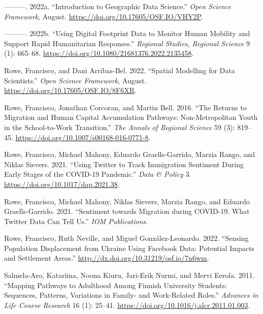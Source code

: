 \documentclass[
  letterpaper,
  DIV=11,
  numbers=noendperiod]{scrreprt}
\newlength{\cslhangindent}
\newlength{\cslentryspacingunit} %
\newenvironment{CSLReferences}[2] %
 {%
  \setlength{\parindent}{0pt}
  \ifodd #1
  \let\oldpar\par
  \def\par{\hangindent=\cslhangindent\oldpar}
  \fi
  \setlength{\parskip}{#2\cslentryspacingunit}
 }%
 {}
\begin{document}
\begin{CSLReferences}{1}{0}
\leavevmode{}%
---------. 2022a. {``Introduction to Geographic Data Science.''}
\emph{Open Science Framework}, August.
\url{https://doi.org/10.17605/OSF.IO/VHY2P}.

\leavevmode{}%
---------. 2022b. {``Using Digital Footprint Data to Monitor Human
Mobility and Support Rapid Humanitarian Responses.''} \emph{Regional
Studies, Regional Science} 9 (1): 665--68.
\url{https://doi.org/10.1080/21681376.2022.2135458}.

\leavevmode{}%
Rowe, Francisco, and Dani Arribas-Bel. 2022. {``Spatial Modelling for
Data Scientists.''} \emph{Open Science Framework}, August.
\url{https://doi.org/10.17605/OSF.IO/8F6XR}.

\leavevmode{}%
Rowe, Francisco, Jonathan Corcoran, and Martin Bell. 2016. {``The
Returns to Migration and Human Capital Accumulation Pathways:
Non-Metropolitan Youth in the School-to-Work Transition.''} \emph{The
Annals of Regional Science} 59 (3): 819--45.
\url{https://doi.org/10.1007/s00168-016-0771-8}.

\leavevmode{}%
Rowe, Francisco, Michael Mahony, Eduardo Graells-Garrido, Marzia Rango,
and Niklas Sievers. 2021. {``Using Twitter to Track Immigration
Sentiment During Early Stages of the COVID-19 Pandemic.''} \emph{Data \&
Policy} 3. \url{https://doi.org/10.1017/dap.2021.38}.

\leavevmode{}%
Rowe, Francisco, Michael Mahony, Niklas Sievers, Marzia Rango, and
Eduardo Graells-Garrido. 2021. {``{Sentiment towards Migration during
COVID-19. What Twitter Data Can Tell Us}.''} \emph{IOM Publications}.

\leavevmode{}%
Rowe, Francisco, Ruth Neville, and Miguel González-Leonardo. 2022.
{``Sensing Population Displacement from Ukraine Using Facebook Data:
Potential Impacts and Settlement Areas.''}
\url{http://dx.doi.org/10.31219/osf.io/7n6wm}.

\leavevmode{}%
Salmela-Aro, Katariina, Noona Kiuru, Jari-Erik Nurmi, and Mervi Eerola.
2011. {``Mapping Pathways to Adulthood Among Finnish University
Students: Sequences, Patterns, Variations in Family- and Work-Related
Roles.''} \emph{Advances in Life Course Research} 16 (1): 25--41.
\url{https://doi.org/10.1016/j.alcr.2011.01.003}.


\end{CSLReferences}
\end{document}
